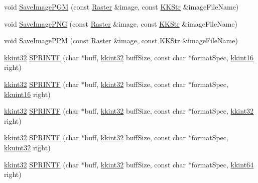\begin{DoxyCompactItemize}
\item 
void \hyperlink{namespace_k_k_b_acff3d0eeecc7b33eb46ff7652a681ff2}{Save\+Image\+P\+GM} (const \hyperlink{class_k_k_b_1_1_raster}{Raster} \&image, const \hyperlink{class_k_k_b_1_1_k_k_str}{K\+K\+Str} \&image\+File\+Name)
\item 
void \hyperlink{namespace_k_k_b_a16fd1069b8feade24d57515ef3827911}{Save\+Image\+P\+NG} (const \hyperlink{class_k_k_b_1_1_raster}{Raster} \&image, const \hyperlink{class_k_k_b_1_1_k_k_str}{K\+K\+Str} \&image\+File\+Name)
\item 
void \hyperlink{namespace_k_k_b_a0998202f24413414f80a04d45df148f0}{Save\+Image\+P\+PM} (const \hyperlink{class_k_k_b_1_1_raster}{Raster} \&image, const \hyperlink{class_k_k_b_1_1_k_k_str}{K\+K\+Str} \&image\+File\+Name)
\item 
\hyperlink{namespace_k_k_b_a8fa4952cc84fda1de4bec1fbdd8d5b1b}{kkint32} \hyperlink{namespace_k_k_b_a8873481c8aabf0bd85dd15dd6087d374}{S\+P\+R\+I\+N\+TF} (char $\ast$buff, \hyperlink{namespace_k_k_b_a8fa4952cc84fda1de4bec1fbdd8d5b1b}{kkint32} buff\+Size, const char $\ast$format\+Spec, \hyperlink{namespace_k_k_b_a93809780ee294124dda4c23069f41248}{kkint16} right)
\item 
\hyperlink{namespace_k_k_b_a8fa4952cc84fda1de4bec1fbdd8d5b1b}{kkint32} \hyperlink{namespace_k_k_b_a651e072586e3d155b8893165918bd635}{S\+P\+R\+I\+N\+TF} (char $\ast$buff, \hyperlink{namespace_k_k_b_a8fa4952cc84fda1de4bec1fbdd8d5b1b}{kkint32} buff\+Size, const char $\ast$format\+Spec, \hyperlink{namespace_k_k_b_aa8c7d4d30381c8a0b6fce68974a9c8a9}{kkuint16} right)
\item 
\hyperlink{namespace_k_k_b_a8fa4952cc84fda1de4bec1fbdd8d5b1b}{kkint32} \hyperlink{namespace_k_k_b_a60afdd0c2c3321d9a6c0d25f3de93553}{S\+P\+R\+I\+N\+TF} (char $\ast$buff, \hyperlink{namespace_k_k_b_a8fa4952cc84fda1de4bec1fbdd8d5b1b}{kkint32} buff\+Size, const char $\ast$format\+Spec, \hyperlink{namespace_k_k_b_a8fa4952cc84fda1de4bec1fbdd8d5b1b}{kkint32} right)
\item 
\hyperlink{namespace_k_k_b_a8fa4952cc84fda1de4bec1fbdd8d5b1b}{kkint32} \hyperlink{namespace_k_k_b_a1765bfe25c445dd195155580f6f46ea6}{S\+P\+R\+I\+N\+TF} (char $\ast$buff, \hyperlink{namespace_k_k_b_a8fa4952cc84fda1de4bec1fbdd8d5b1b}{kkint32} buff\+Size, const char $\ast$format\+Spec, \hyperlink{namespace_k_k_b_af8d832f05c54994a1cce25bd5743e19a}{kkuint32} right)
\item 
\hyperlink{namespace_k_k_b_a8fa4952cc84fda1de4bec1fbdd8d5b1b}{kkint32} \hyperlink{namespace_k_k_b_afdc8754b6c45bc670b6298cb1d7b193f}{S\+P\+R\+I\+N\+TF} (char $\ast$buff, \hyperlink{namespace_k_k_b_a8fa4952cc84fda1de4bec1fbdd8d5b1b}{kkint32} buff\+Size, const char $\ast$format\+Spec, \hyperlink{namespace_k_k_b_aa3486b1c5ea9162b3b020c69f72826eb}{kkint64} right)

\end{DoxyCompactItemize}
